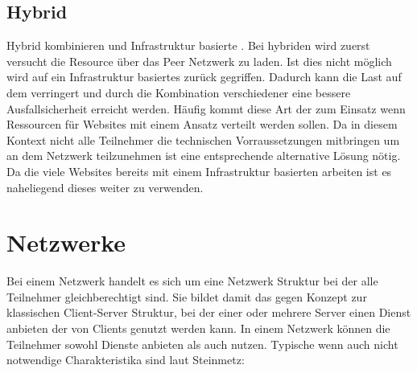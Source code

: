 \subsection{Hybrid \cdns}
Hybrid \cdns kombinieren \pTp \cdns und Infrastruktur basierte \cdns. Bei hybriden \cdns wird zuerst versucht die Resource über das Peer Netzwerk zu laden. Ist dies nicht möglich wird auf ein Infrastruktur basiertes \cdn zurück gegriffen. Dadurch kann die Last auf dem \cdn verringert und durch die Kombination verschiedener \cdns eine bessere Ausfallsicherheit erreicht werden. Häufig kommt diese Art der \cdns zum Einsatz wenn Ressourcen für Websites mit einem \pTp Ansatz verteilt werden sollen. Da in diesem Kontext nicht alle Teilnehmer die technischen Vorraussetzungen mitbringen um an dem \pTp Netzwerk teilzunehmen ist eine entsprechende alternative Lösung nötig. Da die viele Websites bereits mit einem Infrastruktur basierten \cdn arbeiten ist es naheliegend dieses weiter zu verwenden.

\section{\pTp Netzwerke}
Bei einem \pTp Netzwerk handelt es sich um eine Netzwerk Struktur bei der alle Teilnehmer gleichberechtigt sind. Sie bildet damit das gegen Konzept zur klassischen Client-Server Struktur, bei der einer oder mehrere Server einen Dienst anbieten der von Clients genutzt werden kann. In einem \pTp Netzwerk können die Teilnehmer sowohl Dienste anbieten als auch nutzen. Typische wenn auch nicht notwendige Charakteristika sind laut Steinmetz\cite{p2pBook2005}:

